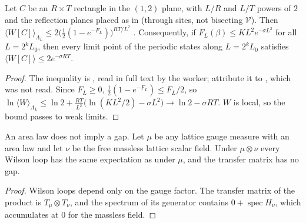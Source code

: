 \begin{proposition}\label{neg:prop-arealaw}
Let $C$ be an $R\times T$ rectangle in the $(1,2)$ plane, with $L/R$ and $L/T$ powers of $2$
and the reflection planes placed as in \cite{KT02} (through sites, not bisecting $\mathcal V$).
Then $\langle W[C]\rangle_{\Lambda_L}\le2\bigl(\tfrac12(1-e^{-F_L})\bigr)^{RT/L^2}$
\cite[(11)]{KT02}. Consequently, if $F_L(\beta)\le KL^2e^{-\sigma L^2}$ for all $L=2^kL_0$, then
every limit point of the periodic states along $L=2^kL_0$ satisfies
$\langle W[C]\rangle\le2e^{-\sigma RT}$.
\end{proposition}

\begin{proof}
The inequality is \cite[(11)]{KT02}, read in full text by the worker; \cite{KT02} attribute it
to \cite{TY85}, which was not read. Since $F_L\ge0$, $\frac12(1-e^{-F_L})\le F_L/2$, so
$\ln\langle W\rangle_{\Lambda_L}\le\ln2+\frac{RT}{L^2}\bigl(\ln(KL^2/2)-\sigma L^2\bigr)\to\ln2-\sigma RT$.
$W$ is local, so the bound passes to weak limits.
\end{proof}

\begin{proposition}\label{neg:prop-noarea}
An area law does not imply a gap. Let $\mu$ be any lattice gauge measure with an area law and
let $\nu$ be the free massless lattice scalar field. Under $\mu\otimes\nu$ every Wilson loop has
the same expectation as under $\mu$, and the transfer matrix has no gap.
\end{proposition}

\begin{proof}
Wilson loops depend only on the gauge factor. The transfer matrix of the product is
$T_\mu\otimes T_\nu$, and the spectrum of its generator contains $0+\operatorname{spec}H_\nu$,
which accumulates at $0$ for the massless field.
\end{proof}

